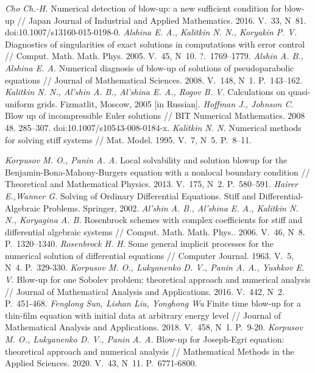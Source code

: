 \documentclass[twoside]{book}
\begin{document}
\begin{CJK*}{GBK}{song}
\begin{thebibliography}{s2}
     {\itshape Cho Ch.-H.} Numerical detection of blow-up: a new sufficient condition for blow-up // Japan Journal of Industrial and Applied Mathematics. 2016. V.~33, N~81. doi:10.1007/s13160-015-0198-0.
     {\itshape Alshina E. A., Kalitkin N. N., Koryakin P. V.} Diagnostics of singularities of exact solutions in computations with error control // Comput. Math. Math. Phys. 2005. V.~45, N~10.  ?.~1769--1779.
     {\itshape Alshin A. B., Alshina E. A.} Numerical diagnosis of blow-up of solutions of pseudoparabolic equations // Journal of Mathematical Sciences. 2008. V.~148, N~1. P.~143--162.
     {\itshape Kalitkin N. N., Al’shin A. B., Al’shina E. A., Rogov B. V.} Calculations on quasi-uniform grids. Fizmatlit, Moscow, 2005 [in Russian].
     {\itshape Hoffman J., Johnson C.} Blow up of incompressible Euler solutions // BIT Numerical Mathematics. 2008 48. 285--307. doi:10.1007/s10543-008-0184-x.
     {\itshape Kalitkin N. N.} Numerical methods for solving stiff systems  // Mat. Model. 1995. V.~7, N~5. P.~8--11.
        
     {\itshape Korpusov M. O., Panin A. A.} Local solvability and solution blowup for the Benjamin-Bona-Mahony-Burgers equation with a nonlocal boundary condition // Theoretical and Mathematical Physics. 2013. V.~175, N~2. P.~580--591.
     {\itshape Hairer E.,Wanner G.} Solving of Ordinary Differential Equations. Stiff and Differential-Algebraic Problems. Springer, 2002.
     {\itshape Al’shin A. B., Al’shina E. A., Kalitkin N. N., Koryagina A. B.} Rosenbrock schemes with complex coefficients for stiff and differential algebraic systems // Comput. Math. Math. Phys.. 2006. V.~46, N~8.  P.~1320--1340.
     {\itshape Rosenbrock H. H.} Some general implicit processes for the numerical solution of differential equations // Computer Journal. 1963. V.~5, N~4. P.~329-330.
     {\itshape Korpusov M. O., Lukyanenko D. V., Panin A. A., Yushkov E. V.}  Blow-up for one Sobolev problem: theoretical approach and numerical analysis // Journal of Mathematical Analysis and Applications. 2016. V.~442, N~2. P.~451-468.
     {\itshape Fenglong Sun, Lishan Liu, Yonghong Wu}  Finite time blow-up for a thin-film equation with initial data at arbitrary energy level // Journal of Mathematical Analysis and Applications. 2018. V.~458, N~1. P.~9-20.
     {\itshape Korpusov M. O., Lukyanenko D. V., Panin A. A.}  Blow-up for Joseph-Egri equation: theoretical approach and numerical analysis // Mathematical Methods in the Applied Sciences. 2020. V.~43, N~11. P.~6771-6800.


\end{thebibliography}
\end{CJK*}
\end{document}
